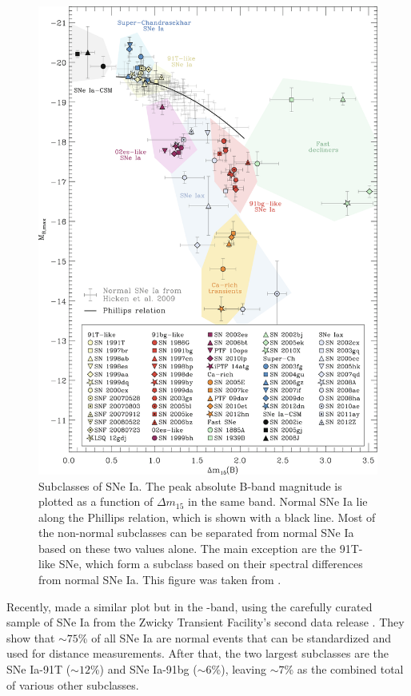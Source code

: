 \documentclass[a4paper,oneside,12pt, class=Latex/Classes/PhDthesisPSnPDF, crop=false]{standalone}
\begin{document}
\begin{figure}
    \centering
    \includegraphics[width=\textwidth]{../Images/chapter_1/Taub_plot.png}
    \caption[SN Ia subclasses.]{Subclasses of SNe Ia. The peak absolute B-band magnitude is plotted as a function of $\Delta m_{15}$ in the same band. Normal SNe Ia lie along the Phillips relation, which is shown with a black line. Most of the non-normal subclasses can be separated from normal SNe Ia based on these two values alone. The main exception are the 91T-like SNe, which form a subclass based on their spectral differences from normal SNe Ia. This figure was taken from \citet{Taubenberger_plot}.}
    \label{Taub_plot}
\end{figure}

Recently, \citet{DR2_diversity} made a similar plot but in the \ztfg-band, using the carefully curated sample of SNe Ia from the Zwicky Transient Facility's second data release \citep[ZTF SN Ia DR2,][Smith et al., in prep.]{DR2_Overview}. They show that $\sim75$\% of all SNe Ia are normal events that can be standardized and used for distance measurements. After that, the two largest subclasses are the SNe Ia-91T ($\sim12$\%) and SNe Ia-91bg ($\sim6$\%), leaving $\sim7$\% as the combined total of various other subclasses.
\end{document}
